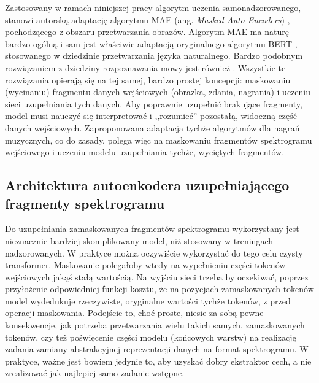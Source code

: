 Zastosowany w ramach niniejszej pracy algorytm uczenia samonadzorowanego, stanowi autorską adaptację
algorytmu MAE (ang. \emph{Masked Auto-Encoders}) \cite{he_masked_2021}, pochodzącego z obszaru
przetwarzania obrazów. Algorytm MAE ma naturę bardzo ogólną i sam jest właściwie adaptacją
oryginalnego algorytmu BERT \cite{devlin_bert_2019}, stosowanego w dziedzinie przetwarzania języka
naturalnego. Bardzo podobnym rozwiązaniem z dziedziny rozpoznawania mowy jest również
\cite{baevski_wav2vec_2020}. Wszystkie te rozwiązania opierają się na tej samej, bardzo prostej
koncepcji: maskowaniu (wycinaniu) fragmentu danych wejściowych (obrazka, zdania, nagrania) i uczeniu
sieci uzupełniania tych danych. Aby poprawnie uzupełnić brakujące fragmenty, model musi nauczyć się
interpretować i ,,rozumieć'' pozostałą, widoczną część danych wejściowych. Zaproponowana adaptacja
tychże algorytmów dla nagrań muzycznych, co do zasady, polega więc na maskowaniu fragmentów
spektrogramu wejściowego i uczeniu modelu uzupełniania tychże, wyciętych fragmentów.

\subsection{Architektura autoenkodera uzupełniającego fragmenty spektrogramu}

Do uzupełniania zamaskowanych fragmentów spektrogramu wykorzystany jest nieznacznie bardziej
skomplikowany model, niż stosowany w treningach nadzorowanych. W praktyce można oczywiście
wykorzystać do tego celu czysty transformer. Maskowanie polegałoby wtedy na wypełnieniu części
tokenów wejściowych jakąś stałą wartością. Na wyjściu sieci trzeba by oczekiwać, poprzez przyłożenie
odpowiedniej funkcji kosztu, że na pozycjach zamaskowanych tokenów model wydedukuje rzeczywiste,
oryginalne wartości tychże tokenów, z przed operacji maskowania. Podejście to, choć proste, niesie
za sobą pewne konsekwencje, jak potrzeba przetwarzania wielu takich samych, zamaskowanych tokenów,
czy też poświęcenie części modelu (końcowych warstw) na realizację zadania zamiany abstrakcyjnej
reprezentacji danych na format spektrogramu. W praktyce, ważne jest bowiem jedynie to, aby uzyskać
dobry ekstraktor cech, a nie zrealizować jak najlepiej samo zadanie wstępne.

